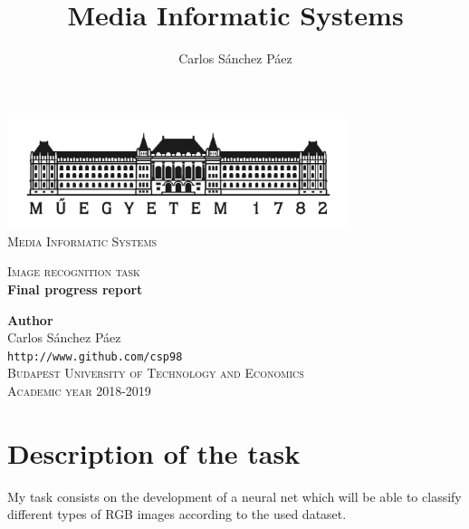 \documentclass[12pt,english]{article}
\title{Media Informatic Systems}
\author{Carlos Sánchez Páez}
\begin{document}
\begin{titlepage}

\newlength{\centeroffset}
\setlength{\centeroffset}{-0.5\oddsidemargin}
\addtolength{\centeroffset}{0.5\evensidemargin}
\thispagestyle{empty}

\noindent\hspace*{\centeroffset}
\begin{minipage}{\textwidth}

\centering
\includegraphics[width=0.75\textwidth]{bme_logo.jpg}\\[1.4cm]

\textsc{ \Large Media Informatic Systems\\[4cm]}

\textsc{\Huge Image recognition task}\\[0.75cm]

{\Large\bfseries Final progress report\\}
\end{minipage}

\vspace{8cm}
\noindent\hspace*{\centeroffset}
\begin{minipage}{\textwidth}
\centering

\textbf{Author}\\ {Carlos Sánchez Páez}\\
\texttt{http://www.github.com/csp98}\\[0.5cm]
\textsc{Budapest University of Technology and Economics}\\
\vspace{1cm}
\textsc{Academic year 2018-2019}
\end{minipage}
\end{titlepage}
\thispagestyle{empty}
\newpage
\tableofcontents{}
\listoffigures
\thispagestyle{empty}
\newpage

\section{Description of the task}

My task consists on the development of a neural net which will be able to classify different types of RGB images according to the used dataset.
\end{document}
